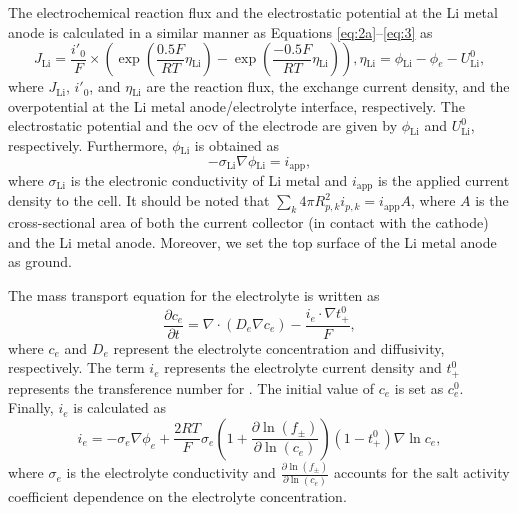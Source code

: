 \documentclass{article}
\begin{document}
The electrochemical reaction flux and the electrostatic potential at
the Li metal anode is calculated in a similar manner as Equations
\ref{eq:2a}--\ref{eq:3} as \cite{dasgupta2016}
\begin{subequations}
\begin{equation}
  J_{\mathrm{Li}}=\frac{i'_0}{F}\times \left(\exp\left(\frac{0.5F}{RT}\eta{}_{\mathrm{Li}}\right)-\exp\left(\frac{-0.5F}{RT}\eta{}_{\mathrm{Li}}\right)\right),
  \label{eq:4a}
\end{equation}
\begin{equation}
  \eta{}_{\mathrm{Li}}=\phi{}_{\mathrm{Li}}-\phi{}_e-U_{\mathrm{Li}}^0,
  \label{eq:4b}
\end{equation}
\end{subequations}
where $J_{\mathrm{Li}}$, $i'_0$, and $\eta{}_{\mathrm{Li}}$ are the
reaction flux, the exchange current density, and the overpotential at
the Li metal anode/electrolyte interface, respectively. The
electrostatic potential and the \gls{ocv} of the electrode are given
by $\phi{}_{\mathrm{Li}}$ and $U_{\mathrm{Li}}^0$,
respectively. Furthermore, $\phi{}_{\mathrm{Li}}$ is obtained
as \cite{newman1993,newman1994}
\begin{equation}
  -\sigma{}_{\mathrm{Li}}\nabla{}\phi{}_{\mathrm{Li}}=i_{\mathrm{app}},
  \label{eq:5}
\end{equation}
where $\sigma{}_{\mathrm{Li}}$ is the electronic conductivity of Li
metal and $i_{\mathrm{app}}$ is the applied current density to the
cell. It should be noted that $\sum_k4\pi
R_{p,k}^2i_{p,k}=i_{\mathrm{app}}A$, where $A$ is the cross-sectional
area of both the current collector (in contact with the \nca{}
cathode) and the Li metal anode. Moreover, we set the top surface of
the Li metal anode as ground.

The mass transport equation for the electrolyte is written as \cite{newman1993,newman1994}
\begin{equation}
  \frac{\partial c_e}{\partial t} = \nabla \cdot \left(D_e \nabla c_e \right) - \frac{i_e\cdot\nabla{}t_{+}^0}{F},
  \label{eq:6}
\end{equation}
where $c_e$ and $D_e$ represent the electrolyte concentration and diffusivity, respectively. The term $i_e$ represents
the electrolyte current density and $t_+^0$ represents the
transference number for . The initial value of $c_e$ is set
as $c_e^0$. Finally, $i_e$ is calculated
as \cite{newman1993,newman1994}
\begin{equation}
  i_e=-\sigma_e\nabla \phi _e+\frac{2RT}{F}\sigma_e\left(1+\frac{\partial \ln \left(f_{\pm}\right)}{\partial \ln \left(c_e\right)}\right)\left(1-t_+^0\right)\nabla \ln c_e,
  \label{eq:7}
\end{equation}
where $\sigma_e$ is the electrolyte conductivity and $\frac{\partial
  \ln \left(f_\pm\right)}{\partial \ln \left(c_e\right)}$ accounts for
the salt activity coefficient dependence on the electrolyte
concentration.
\end{document}
